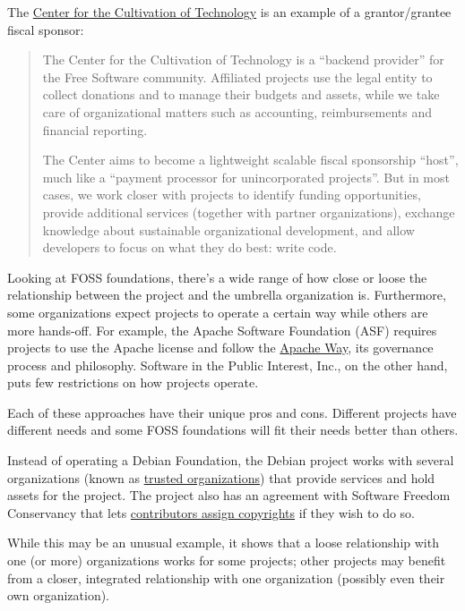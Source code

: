 \begin{kaobox}[frametitle=Center for the Cultivation of Technology: a grantor/grantee fiscal sponsor]

The \href{https://techcultivation.org/}{Center for the Cultivation of Technology} is an example of a grantor/grantee fiscal sponsor:

\begin{quote}

The Center for the Cultivation of Technology is a ``backend provider'' for the Free Software community. Affiliated projects use the legal entity to collect donations and to manage their budgets and assets, while we take care of organizational matters such as accounting, reimbursements and financial reporting.

The Center aims to become a lightweight scalable fiscal sponsorship ``host'', much like a ``payment processor for unincorporated projects''. But in most cases, we work closer with projects to identify funding opportunities, provide additional services (together with partner organizations), exchange knowledge about sustainable organizational development, and allow developers to focus on what they do best: write code.

\end{quote}

\end{kaobox}

Looking at FOSS foundations, there's a wide range of how close or loose the relationship between the project and the umbrella organization is.  Furthermore, some organizations expect projects to operate a certain way while others are more hands-off.  For example, the Apache Software Foundation (ASF) requires projects to use the Apache license and follow the \href{https://www.apache.org/theapacheway/}{Apache Way}, its governance process and philosophy.  Software in the Public Interest, Inc., on the other hand, puts few restrictions on how projects operate.

Each of these approaches have their unique pros and cons.  Different projects have different needs and some FOSS foundations will fit their needs better than others.

\begin{kaobox}[frametitle=Debian and its trusted organizations]

Instead of operating a Debian Foundation, the Debian project works with several organizations (known as \href{https://wiki.debian.org/Teams/Treasurer/Organizations}{trusted organizations}) that provide services and hold assets for the project.  The project also has an agreement with Software Freedom Conservancy that lets \href{https://sfconservancy.org/copyleft-compliance/#debian}{contributors assign copyrights} if they wish to do so.

While this may be an unusual example, it shows that a loose relationship with one (or more) organizations works for some projects; other projects may benefit from a closer, integrated relationship with one organization (possibly even their own organization).

\end{kaobox}

